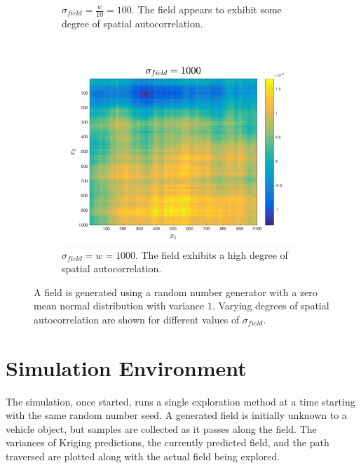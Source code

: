 \begin{figure}[ht!]
\begin{subfigure}[t]{0.33333\textwidth}
        \caption{$\sigma_{field} = \frac{w}{10} = 100$. The field appears to exhibit some degree of spatial autocorrelation.}
    \end{subfigure}%
    ~ 
    \begin{subfigure}[t]{0.33333\textwidth}
        \centering
        \includegraphics[width=\linewidth]{figures/autocorr_sigma_1000.png}
		\captionsetup{skip=0.25\baselineskip,size=footnotesize}
		\ssp
        \caption{$\sigma_{field} = w = 1000$. The field exhibits a high degree of spatial autocorrelation.}
    \end{subfigure}
    \ssp
    \caption{A field is generated using a random number generator with a zero mean normal distribution with variance $1$. Varying degrees of spatial autocorrelation are shown for different values of $\sigma_{field}$.}
\end{figure}

\section{Simulation Environment}
The simulation, once started, runs a single exploration method at a time starting with the same random number seed. A generated field is initially unknown to a vehicle object, but samples are collected as it passes along the field. The variances of Kriging predictions, the currently predicted field, and the path traversed are plotted along with the actual field being explored.


